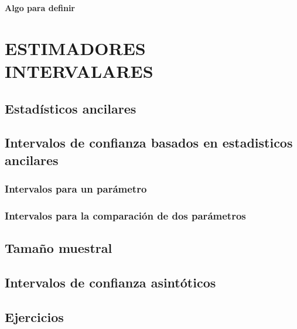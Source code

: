 \documentclass[]{book}
\theoremstyle{definition}
\theoremstyle{definition}
\theoremstyle{definition}
\theoremstyle{remark}
\begin{document}
\textbf{Algo para definir}

\hypertarget{intervalo}{%
\chapter{ESTIMADORES INTERVALARES}\label{intervalo}}

\hypertarget{estaduxedsticos-ancilares}{%
\section{Estadísticos ancilares}\label{estaduxedsticos-ancilares}}

\hypertarget{intervalos-de-confianza-basados-en-estadisticos-ancilares}{%
\section{Intervalos de confianza basados en estadisticos ancilares}\label{intervalos-de-confianza-basados-en-estadisticos-ancilares}}

\hypertarget{intervalos-para-un-paruxe1metro}{%
\subsection{Intervalos para un parámetro}\label{intervalos-para-un-paruxe1metro}}

\hypertarget{intervalos-para-la-comparaciuxf3n-de-dos-paruxe1metros}{%
\subsection{Intervalos para la comparación de dos parámetros}\label{intervalos-para-la-comparaciuxf3n-de-dos-paruxe1metros}}

\hypertarget{tamauxf1o-muestral}{%
\section{Tamaño muestral}\label{tamauxf1o-muestral}}

\hypertarget{intervalos-de-confianza-asintuxf3ticos}{%
\section{Intervalos de confianza asintóticos}\label{intervalos-de-confianza-asintuxf3ticos}}

\hypertarget{ejercicios}{%
\section{Ejercicios}\label{ejercicios}}
\end{document}
